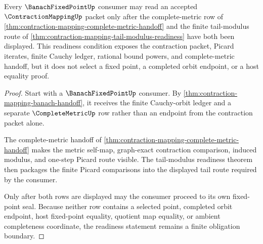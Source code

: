 \begin{theorem}
\label{thm:contraction-mapping-fixed-point-readiness}
Every $\BanachFixedPointUp$ consumer may read an accepted $\ContractionMappingUp$ packet only after the complete-metric row of \autoref{thm:contraction-mapping-complete-metric-handoff} and the finite tail-modulus route of \autoref{thm:contraction-mapping-tail-modulus-readiness} have both been displayed. This readiness condition exposes the contraction packet, Picard iterates, finite Cauchy ledger, rational bound powers, and complete-metric handoff, but it does not select a fixed point, a completed orbit endpoint, or a host equality proof.
\end{theorem}
\begin{proof}
Start with a $\BanachFixedPointUp$ consumer. By \autoref{thm:contraction-mapping-banach-handoff}, it receives the finite Cauchy-orbit ledger and a separate $\CompleteMetricUp$ row rather than an endpoint from the contraction packet alone.

The complete-metric handoff of \autoref{thm:contraction-mapping-complete-metric-handoff} makes the metric self-map, graph-exact contraction comparison, induced modulus, and one-step Picard route visible. The tail-modulus readiness theorem then packages the finite Picard comparisons into the displayed tail route required by the consumer.

Only after both rows are displayed may the consumer proceed to its own fixed-point seal. Because neither row contains a selected point, completed orbit endpoint, host fixed-point equality, quotient map equality, or ambient completeness coordinate, the readiness statement remains a finite obligation boundary.
\end{proof}

